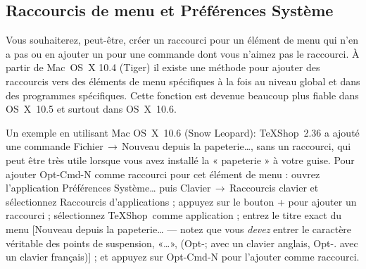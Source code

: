 \documentclass[11pt,french]{article}
\newcommand{\TS}{\textsf{\TeX Shop}}
\newcommand{\cmd}[1]{\textsf{#1}}
\newcommand{\mnu}[1]{\textsf{#1}}
\newcommand{\To}{\,\(\to\)\,}
\begin{document}

\subsection{Raccourcis de menu et Préférences Système}

Vous souhaiterez, peut-être, créer un raccourci pour un élément de menu qui n'en a pas ou en ajouter un pour une commande dont vous n'aimez pas le raccourci. À partir de Mac~OS~X 10.4 (Tiger) il existe une méthode pour ajouter des raccourcis vers des éléments de menu spécifiques à la fois au niveau global et dans des programmes spécifiques. Cette fonction est devenue beaucoup plus fiable dans OS~X~10.5 et surtout dans OS~X~10.6.

Un exemple en utilisant Mac OS~X~10.6 (Snow Leopard): \TS\ 2.36 a ajouté une commande \mnu{Fichier}\To\mnu{Nouveau depuis la papeterie…}, sans un raccourci, qui peut être très utile lorsque vous avez installé la « papeterie » à votre guise. Pour ajouter \cmd{Opt-Cmd-N} comme raccourci pour cet élément de menu : ouvrez l'application \textsf{Préférences Système…} puis \mnu{Clavier}\To\mnu{Raccourcis clavier} et sélectionnez \mnu{Raccourcis  d'applications} ; appuyez sur le bouton \mnu{+} pour ajouter un raccourci ; sélectionnez \TS\ comme application ; entrez le titre exact du menu [\mnu{Nouveau depuis la papeterie…} --- notez que vous \emph{devez} entrer le caractère véritable des points de suspension, «…», (\cmd{Opt-;} avec un clavier anglais, \cmd{Opt-.} avec un clavier français)] ; et appuyez sur \cmd{Opt-Cmd-N} pour l'ajouter comme raccourci.

%
\end{document}
